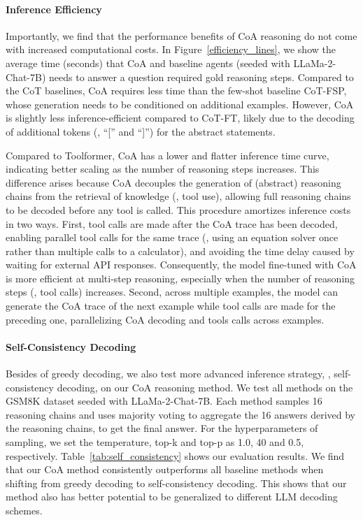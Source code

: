 \paragraph{Inference Efficiency}
Importantly, we find that the performance benefits of CoA reasoning do not come with increased computational costs.
In Figure~\ref{efficiency_lines}, we show the average time (seconds) that CoA and baseline agents (seeded with LLaMa-2-Chat-7B) needs to answer a question \wrt{} required gold reasoning steps.
Compared to the CoT baselines, CoA requires less time than the few-shot baseline CoT-FSP, whose generation needs to be conditioned on additional examples.
However, CoA is slightly less inference-efficient compared to CoT-FT, likely due to the decoding of additional tokens (\eg{}, ``['' and ``]'') for the abstract statements.

Compared to Toolformer, CoA has a lower and flatter inference time curve, indicating better scaling as the number of reasoning steps increases.
This difference arises because CoA decouples the generation of (abstract) reasoning chains from the retrieval of knowledge (\ie{}, tool use), allowing full reasoning chains to be decoded before any tool is called.
This procedure amortizes inference costs in two ways. 
First, tool calls are made after the CoA trace has been decoded, enabling parallel tool calls for the same trace (\eg, using an equation solver once rather than multiple calls to a calculator), and avoiding the time delay caused by waiting for external API responses. Consequently, the model fine-tuned with CoA is more efficient at multi-step reasoning, especially when the number of reasoning steps (\ie{}, tool calls) increases.
Second, across multiple examples, the model can generate the CoA trace of the next example while tool calls are made for the preceding one, parallelizing CoA decoding and tools calls across examples.

\paragraph{Self-Consistency Decoding}
Besides of greedy decoding, we also test more advanced inference strategy, \ie{}, self-consistency \citep{wang2022self} decoding, on our CoA reasoning method.
We test all methods on the GSM8K dataset seeded with LLaMa-2-Chat-7B.
Each method samples 16 reasoning chains and uses majority voting to aggregate the 16 answers derived by the reasoning chains, to get the final answer.
For the hyperparameters of sampling, we set the temperature, top-k and top-p as 1.0, 40 and 0.5, respectively.
Table~\ref{tab:self_consistency} shows our evaluation results.
We find that our CoA method consistently outperforms all baseline methods when shifting from greedy decoding to self-consistency decoding.
This shows that our method also has better potential to be generalized to different LLM decoding schemes.

